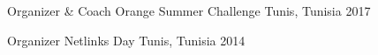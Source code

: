 

\begin{cvhonors}

	\cvhonor
		{Organizer \& Coach} %
		{Orange Summer Challenge} %
		{Tunis, Tunisia} %
		{2017} %

  \cvhonor
    {Organizer} %
    {Netlinks Day} %
    {Tunis, Tunisia} %
    {2014} %

\end{cvhonors}
